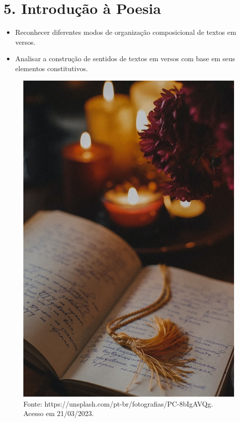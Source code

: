 \chapter{5. Introdução à Poesia}



\begin{itemize}
\item Reconhecer diferentes modos de organização composicional de textos em
versos.

\item Analisar a construção de sentidos de textos em versos com base em seus
elementos constitutivos.
\end{itemize}

\begin{figure}[htpb!]
\includegraphics[width=.5\textwidth]{./imgs/img16.jpg}
\caption{Fonte: https://unsplash.com/pt-br/fotografias/PC-8bIgAVQg. Acesso em 21/03/2023.}
\end{figure}

